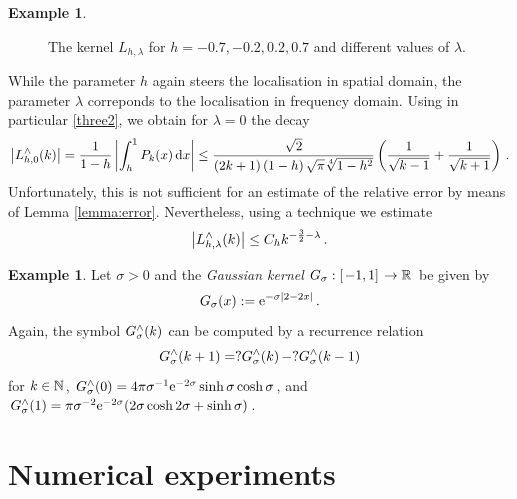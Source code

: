 \documentclass[11pt,a4paper,twoside,bibtotoc]{scrartcl}
\theoremstyle{plain}
\theoremstyle{definition}
\newtheorem{example}[theorem]{Example}
\theoremstyle{remark}
\numberwithin{equation}{section}
\numberwithin{table}{section}
\numberwithin{figure}{section}
\begin{document}
\begin{example}
\begin{figure}[tb]
    \caption{The kernel $L_{h,\lambda}$ for $h = -0.7, -0.2, 0.2, 0.7$ and different values of $\lambda$.}
    \label{Basics:Figure:LKernel}
  \end{figure}
  While the parameter $h$ again steers the localisation in spatial domain, the
  parameter $\lambda$ correponds to the localisation in frequency domain.
  Using in particular \eqref{three2}, we obtain for $\lambda=0$ the decay
  \[
  \left|L_{h,0}^{\wedge}{\hspace{-0.4ex}}\left(k\right)\right| = \frac{1}{1-h}
  \left|\int_{h}^{1} P_{k}{\hspace{-0.4ex}}\left(x\right) \text{\rm{d}} x\right| \le
  \frac{\sqrt{2}}{\left(2k+1\right)\left(1-h\right)\sqrt{\pi}\sqrt[4]{1-h^2}}
  \left(\frac{1}{\sqrt{k-1}}+\frac{1}{\sqrt{k+1}}\right)\,.
  \]
  Unfortunately, this is not sufficient for an estimate of the relative error
  by means of Lemma \ref{lemma:error}.
  Nevertheless, using a technique we estimate
  \[
  \left|L_{h,\lambda}^{\wedge}{\hspace{-0.4ex}}\left(k\right)\right| \le C_h
  k^{-\frac{3}{2}-\lambda}\,.
  \] 
\end{example}

\begin{example}
  Let $\sigma>0$ and the \emph{Gaussian kernel}
  $G_{\sigma}:\left[\left.-1,1\right]\right. \rightarrow \mathbb{R}$ be given by
  \begin{equation}
    \label{GaussKernel}
    \nonumber
    G_{\sigma}{\hspace{-0.4ex}}\left(x\right) := \mbox{\rm{e}}^{-\sigma |2-2x|}\,.
  \end{equation}
  Again, the symbol $G_{\sigma}^{\wedge}{\hspace{-0.4ex}}\left(k\right)$ can be computed by a
  recurrence relation
  \[
  G_{\sigma}^{\wedge}{\hspace{-0.4ex}}\left(k+1\right) = ?
  G_{\sigma}^{\wedge}{\hspace{-0.4ex}}\left(k\right)   - ?
  G_{\sigma}^{\wedge}{\hspace{-0.4ex}}\left(k-1\right)
  \]
  for $k\in \mathbb{N}$, $G_{\sigma}^{\wedge}{\hspace{-0.4ex}}\left(0\right) = 4 \pi \sigma^{-1}
  \mbox{\rm{e}}^{-2\sigma} \sinh \sigma \cosh \sigma$, and $G_{\sigma}^{\wedge}{\hspace{-0.4ex}}\left(1\right) = \pi \sigma^{-2}
  \mbox{\rm{e}}^{-2\sigma} (2 \sigma \cosh 2 \sigma + \sinh \sigma )$.
\end{example}

\section{Numerical experiments}
\end{document}
